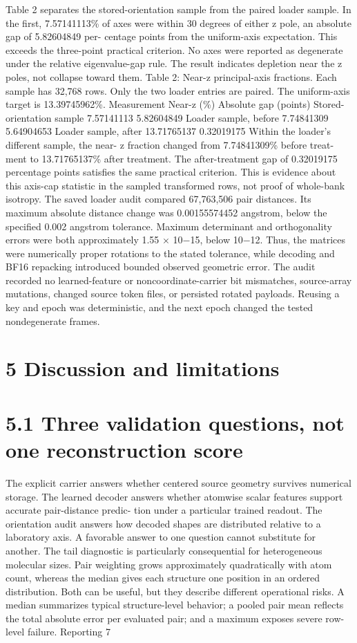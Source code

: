 \documentclass[11pt]{article}
\begin{document}
Table 2 separates the stored-orientation sample from the paired loader sample. In the first,
7.57141113\% of axes were within 30 degrees of either z pole, an absolute gap of 5.82604849 per-
centage points from the uniform-axis expectation. This exceeds the three-point practical criterion.
No axes were reported as degenerate under the relative eigenvalue-gap rule. The result indicates
depletion near the z poles, not collapse toward them.
Table 2: Near-z principal-axis fractions. Each sample has 32,768 rows. Only the two loader entries
are paired. The uniform-axis target is 13.39745962\%.
Measurement Near-z (\%) Absolute gap (points)
Stored-orientation sample 7.57141113 5.82604849
Loader sample, before 7.74841309 5.64904653
Loader sample, after 13.71765137 0.32019175
Within the loader’s different sample, the near- z fraction changed from 7.74841309\% before treat-
ment to 13.71765137\% after treatment. The after-treatment gap of 0.32019175 percentage points
satisfies the same practical criterion. This is evidence about this axis-cap statistic in the sampled
transformed rows, not proof of whole-bank isotropy.
The saved loader audit compared 67,763,506 pair distances. Its maximum absolute distance
change was 0.00155574452 angstrom, below the specified 0.002 angstrom tolerance. Maximum
determinant and orthogonality errors were both approximately 1.55 \ensuremath{\times} 10\ensuremath{-}15, below 10\ensuremath{-}12. Thus,
the matrices were numerically proper rotations to the stated tolerance, while decoding and BF16
repacking introduced bounded observed geometric error. The audit recorded no learned-feature
or noncoordinate-carrier bit mismatches, source-array mutations, changed source token files, or
persisted rotated payloads. Reusing a key and epoch was deterministic, and the next epoch changed
the tested nondegenerate frames.

\section*{5 Discussion and limitations}


\section*{5.1 Three validation questions, not one reconstruction score}

The explicit carrier answers whether centered source geometry survives numerical storage. The
learned decoder answers whether atomwise scalar features support accurate pair-distance predic-
tion under a particular trained readout. The orientation audit answers how decoded shapes are
distributed relative to a laboratory axis. A favorable answer to one question cannot substitute for
another.
The tail diagnostic is particularly consequential for heterogeneous molecular sizes. Pair weighting
grows approximately quadratically with atom count, whereas the median gives each structure one
position in an ordered distribution. Both can be useful, but they describe different operational
risks. A median summarizes typical structure-level behavior; a pooled pair mean reflects the total
absolute error per evaluated pair; and a maximum exposes severe row-level failure. Reporting
7
\end{document}
